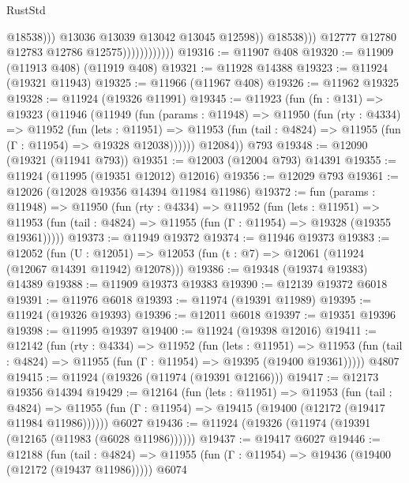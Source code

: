 \begin{lexlean}{RustStd}
\begin{coremodule}
                                            @18538)))
                                      @13036
                                      @13039
                                      @13042
                                      @13045
                                      @12598))
                                  @18538)))
                            @12777
                            @12780
                            @12783
                            @12786
                            @12575))))))))))))
@19316 := @11907 @408
@19320 := @11909 (@11913 @408) (@11919 @408)
@19321 := @11928 @14388
@19323 := @11924 (@19321 @11943)
@19325 := @11966 (@11967 @408)
@19326 := @11962 @19325
@19328 := @11924 (@19326 @11991)
@19345 := @11923
    (fun (fn : @131) =>
    @19323
      (@11946
        (@11949
          (fun (params : @11948) =>
          @11950
            (fun (rty : @4334) =>
            @11952
              (fun (lets : @11951) =>
              @11953 (fun (tail : @4824) => @11955 (fun (Γ : @11954) => @19328 @12038))))))
        @12084))
    @793
@19348 := @12090 (@19321 (@11941 @793))
@19351 := @12003 (@12004 @793) @14391
@19355 := @11924 (@11995 (@19351 @12012) @12016)
@19356 := @12029 @793
@19361 := @12026 (@12028 @19356 @14394 @11984 @11986)
@19372 := fun (params : @11948) =>
  @11950
    (fun (rty : @4334) =>
    @11952
      (fun (lets : @11951) =>
      @11953 (fun (tail : @4824) => @11955 (fun (Γ : @11954) => @19328 (@19355 @19361)))))
@19373 := @11949 @19372
@19374 := @11946 @19373
@19383 := @12052
    (fun (U : @12051) => @12053 (fun (t : @7) => @12061 (@11924 (@12067 @14391 @11942) @12078)))
@19386 := @19348 (@19374 @19383) @14389
@19388 := @11909 @19373 @19383
@19390 := @12139 @19372 @6018
@19391 := @11976 @6018
@19393 := @11974 (@19391 @11989)
@19395 := @11924 (@19326 @19393)
@19396 := @12011 @6018
@19397 := @19351 @19396
@19398 := @11995 @19397
@19400 := @11924 (@19398 @12016)
@19411 := @12142
    (fun (rty : @4334) =>
    @11952
      (fun (lets : @11951) =>
      @11953 (fun (tail : @4824) => @11955 (fun (Γ : @11954) => @19395 (@19400 @19361)))))
    @4807
@19415 := @11924 (@19326 (@11974 (@19391 @12166)))
@19417 := @12173 @19356 @14394
@19429 := @12164
    (fun (lets : @11951) =>
    @11953
      (fun (tail : @4824) =>
      @11955 (fun (Γ : @11954) => @19415 (@19400 (@12172 (@19417 @11984 @11986))))))
    @6027
@19436 := @11924 (@19326 (@11974 (@19391 (@12165 (@11983 (@6028 @11986))))))
@19437 := @19417 @6027
@19446 := @12188
    (fun (tail : @4824) => @11955 (fun (Γ : @11954) => @19436 (@19400 (@12172 (@19437 @11986)))))
    @6074

\end{coremodule}
\end{lexlean}
